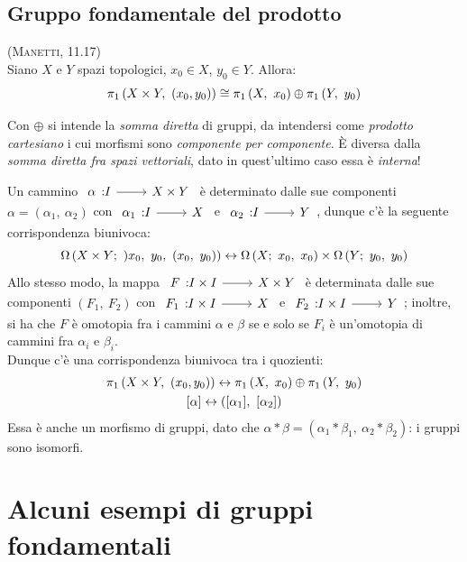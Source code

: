 \subsection{Gruppo fondamentale del prodotto}
\begin{theorema} \textsc{(Manetti, 11.17)}\\
	Siano $X$ e $Y$ spazi topologici, $x_0\in X$, $y_0\in Y$. Allora:
	\begin{equation}
		\gruf{X\times Y}{(x_0,y_0)}\cong \gruf{X}{x_0}\oplus \gruf{Y}{y_0}
	\end{equation}
\vspace{-6mm}
\end{theorema}
\begin{attention}
	Con $\oplus$ si intende la \textit{somma diretta} di gruppi, da intendersi come \textit{prodotto cartesiano} i cui morfismi sono \textit{componente per componente}. È diversa dalla \textit{somma diretta fra spazi vettoriali}, dato in quest'ultimo caso essa è \textit{interna}!
\end{attention}
\begin{demonstration}
	Un cammino $\funz \alpha I {X\times Y}$ è determinato dalle sue componenti $\alpha=(\alpha_1,\ \alpha_2)$ con $\funz {\alpha_1} I X$ e $\funz {\alpha_2} I Y$, dunque c'è la seguente corrispondenza biunivoca:
	\begin{equation*}
		\inscam{X\times Y}{)x_0,\ y_0}{(x_0,\ y_0)}\leftrightarrow\inscam{X}{x_0}{x_0}\times \inscam{Y}{y_0}{y_0}
	\end{equation*}
Allo stesso modo, la mappa $\funz F {I\times I} {X\times Y}$ è determinata dalle sue componenti $(F_1,\ F_2)$ con $ \funz {F_1} {I\times I} X$ e $\funz {F_2} {I\times I} Y$; inoltre, si ha che $F$ è omotopia fra i cammini $\alpha$ e $\beta$ se e solo se $F_i$ è un'omotopia di cammini fra $\alpha_i$ e $\beta_i$. \\
Dunque c'è una corrispondenza biunivoca tra i quozienti:
\begin{gather*}
	\gruf{X\times Y}{(x_0,y_0)}\leftrightarrow \gruf{X}{x_0}\oplus \gruf{Y}{y_0}\\
	[\alpha]\leftrightarrow ([\alpha_1],\ [\alpha_2])
\end{gather*}
Essa è anche un morfismo di gruppi, dato che $\alpha\ast\beta = (\alpha_1\ast\beta_1,\ \alpha_2\ast\beta_2)$: i gruppi sono isomorfi.
\end{demonstration}
\section{Alcuni esempi di gruppi fondamentali}

